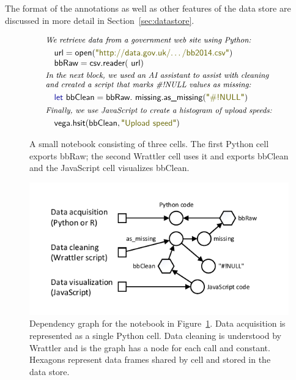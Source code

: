 \documentclass[sigplan,preprint,10pt]{acmart}\settopmatter{printfolios=true,printccs=false,printacmref=false}
\theoremstyle{plain}
\theoremstyle{definition}
\newcommand{\str}[1]{\textnormal{\textcolor{strclr}{\sffamily "#1"}}}
\newcommand{\ident}[1]{\textnormal{\sffamily #1}}
\newcommand{\kvd}[1]{\textnormal{\textcolor{kvdclr}{\sffamily #1}}}
\begin{document}
\noindent
The format of the annotations as well as other features of the data store are discussed in 
more detail in Section~\ref{sec:datastore}.

\begin{figure}
\begin{equation*}
\begin{array}{l}
\textit{\small{We retrieve data from a government web site using Python:}}\\[0.3em]
\quad\ident{url}=\ident{open}(\str{http://data.gov.uk/\ldots/bb2014.csv})\\
\quad\ident{bbRaw}=\ident{csv.reader}(\ident{url})\\[0.2em]
\textit{\small{In the next block, we used an AI assistant to assist with cleaning}}\\[-0.1em]
\textit{\small{and created a script that marks \#!NULL values as missing:}}\\[0.3em]
\quad\kvd{let}~\ident{bbClean} = \ident{bbRaw}.\ident{missing}.\ident{as\_missing}(\str{\#!NULL})\\[0.3em]
\textit{\small{Finally, we use JavaScript to create a histogram of upload speeds:}}\\[0.3em]
\quad\ident{vega}.\ident{hsit}(\ident{bbClean}, \str{Upload speed})
\end{array}
\end{equation*}
\vspace{-0.5em}
\caption{\small{A small notebook consisting of three cells. The first Python cell exports 
\ident{bbRaw}; the second Wrattler cell uses it and exports \ident{bbClean} and the 
JavaScript cell visualizes \ident{bbClean}.}}
\label{fig:notebook}
\end{figure}
\begin{figure}
\includegraphics[scale=1,trim=0.5cm 0.5cm 0.5cm 0.5cm]{graph.pdf}

\caption{\small{Dependency graph for the notebook in Figure~\ref{fig:notebook}.
Data acquisition is represented as a single Python cell. Data cleaning is understood
by Wrattler and is the graph has a node for each call and constant. Hexagons represent
data frames shared by cell and stored in the data store.}}
\label{fig:deps}
\vspace{-0.5em}
\end{figure}
\end{document}

